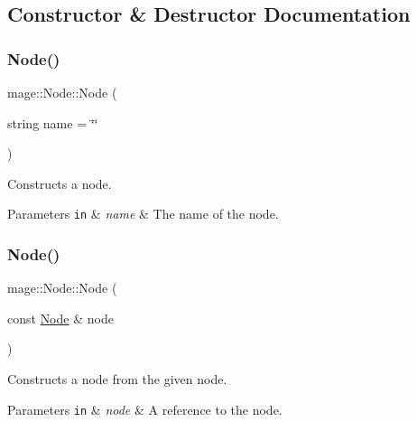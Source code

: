 \subsection{Constructor \& Destructor Documentation}
\hypertarget{classmage_1_1_node_a6638b75608b2b340743a0a639230492d}{}\label{classmage_1_1_node_a6638b75608b2b340743a0a639230492d} 
\subsubsection{\texorpdfstring{Node()}{Node()}\hspace{0.1cm}{\footnotesize\ttfamily [1/3]}}
{\footnotesize\ttfamily mage\+::\+Node\+::\+Node (\begin{DoxyParamCaption}\item[{string}]{name = {\ttfamily \char`\"{}\char`\"{}} }\end{DoxyParamCaption})\hspace{0.3cm}{\ttfamily [explicit]}}

Constructs a node.


\begin{DoxyParams}[1]{Parameters}
\mbox{\tt in}  & {\em name} & The name of the node. \\
\hline
\end{DoxyParams}
\hypertarget{classmage_1_1_node_af9da591163469f210895f3a5b389d7cc}{}\label{classmage_1_1_node_af9da591163469f210895f3a5b389d7cc} 
\subsubsection{\texorpdfstring{Node()}{Node()}\hspace{0.1cm}{\footnotesize\ttfamily [2/3]}}
{\footnotesize\ttfamily mage\+::\+Node\+::\+Node (\begin{DoxyParamCaption}\item[{const \hyperlink{classmage_1_1_node}{Node} \&}]{node }\end{DoxyParamCaption})}

Constructs a node from the given node.


\begin{DoxyParams}[1]{Parameters}
\mbox{\tt in}  & {\em node} & A reference to the node. \\
\hline
\end{DoxyParams}
\hypertarget{classmage_1_1_node_adbc40b6c4100f74faa2b59a7a0b79388}{}\label{classmage_1_1_node_adbc40b6c4100f74faa2b59a7a0b79388} 
